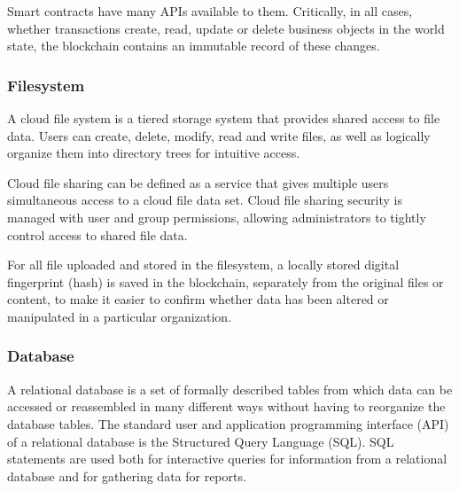 Smart contracts have many APIs available to them. Critically, in all cases, whether transactions create, read, update or delete business objects in the world state, the blockchain contains an immutable record of these changes.

\subsubsection{Filesystem}\label{sec:Filesystem}
A cloud file system is a tiered storage system that provides shared access to file data. Users can create, delete, modify, read and write files, as well as logically organize them into directory trees for intuitive access.

Cloud file sharing can be defined as a service that gives multiple users simultaneous access to a cloud file data set. Cloud file sharing security is managed with user and group permissions, allowing administrators to tightly control access to shared file data.

For all file uploaded and stored in the filesystem, a locally stored digital fingerprint (hash) is saved in the blockchain, separately from the original files or content, to make it easier to confirm whether data has been altered or manipulated in a particular organization.

\subsubsection{Database}\label{sec:Database}
A relational database is a set of formally described tables from which data can be accessed or reassembled in many different ways without having to reorganize the database tables. The standard user and application programming interface (API) of a relational database is the Structured Query Language (SQL). SQL statements are used both for interactive queries for information from a relational database and for gathering data for reports.
